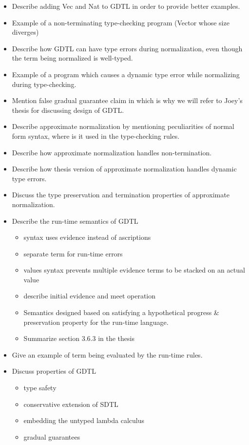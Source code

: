 \documentclass{article}
\begin{document}
\begin{itemize}
  \item Describe adding Vec and Nat to GDTL in order to provide better examples.
  \item Example of a non-terminating type-checking program (Vector whose size diverges)
  \item Describe how GDTL can have type errors during normalization, even though
    the term being normalized is well-typed.
  \item Example of a program which causes a dynamic type error while normalizing
    during type-checking.
  \item Mention false gradual guarantee claim in
    \cite{eremondi_approximate_2019} which is why we will refer to Joey's thesis
    \cite{eremondi_design_2023} for discussing design of GDTL.
  \item Describe approximate normalization by mentioning peculiarities of normal
    form syntax, where is it used in the type-checking rules.
  \item Describe how approximate normalization handles non-termination.
  \item Describe how thesis version of approximate normalization handles dynamic
    type errors.
  \item Discuss the type preservation and termination properties of approximate
    normalization.
  \item Describe the run-time semantics of GDTL
    \begin{itemize}
    \item syntax uses evidence instead of ascriptions
    \item separate term for run-time errors
    \item values syntax prevents multiple evidence terms to be stacked on an actual value
    \item describe initial evidence and meet operation
    \item Semantics designed based on satisfying a hypothetical progress
      \& preservation property for the run-time language.
    \item Summarize section 3.6.3 in the thesis
    \end{itemize}
  \item Give an example of term being evaluated by the run-time rules.
  \item Discuss properties of GDTL
    \begin{itemize}
      \item type safety
      \item conservative extension of SDTL
      \item embedding the untyped lambda calculus
      \item gradual guarantees
    \end{itemize}
\end{itemize}
\end{document}
